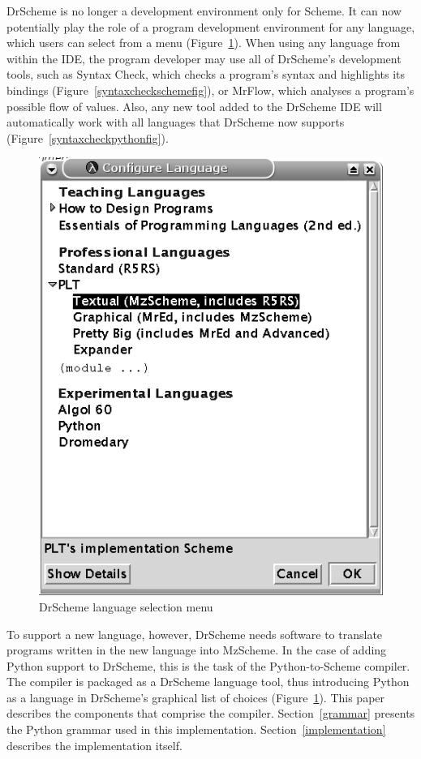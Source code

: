 DrScheme is no longer a development environment only for Scheme.  It can now potentially play the role of a program development environment for any language, which users can select from a menu (Figure~\ref{drschemelangmenufig}).  When using any language from within the IDE, the program developer may use all of DrScheme's development tools, such as Syntax Check, which checks a program's syntax and highlights its bindings (Figure~\ref{syntaxcheckschemefig}), or MrFlow, which analyses a program's possible flow of values.  Also, any new tool added to the DrScheme IDE will automatically work with all languages that DrScheme now supports (Figure~\ref{syntaxcheckpythonfig}).

\begin{figure}
	\caption{DrScheme language selection menu}
	\label{drschemelangmenufig}
	\begin{center}
		\includegraphics{images/drscheme-lang-menu}
	\end{center}
\end{figure}

To support a new language, however, DrScheme needs software to translate programs written in the new language into MzScheme.  In the case of adding Python support to DrScheme, this is the task of the Python-to-Scheme compiler.  The compiler is packaged as a DrScheme language tool, thus introducing Python as a language in DrScheme's graphical list of choices (Figure~\ref{drschemelangmenufig}).  This paper describes the components that comprise the compiler.  Section~\ref{grammar} presents the Python grammar used in this implementation.  Section~\ref{implementation} describes the implementation itself.

